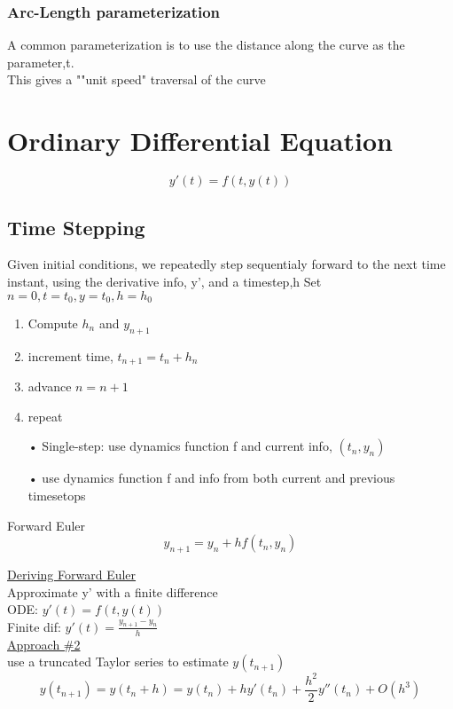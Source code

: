 \documentclass[10pt,usletter]{article}
\begin{document}
\subsubsection{Arc-Length parameterization}
A common parameterization is to use the distance along the curve as the parameter,t.\\
This gives a ""unit speed" traversal of the curve

\section{Ordinary Differential Equation}

$$y'(t)=f(t,y(t))$$

\subsection{Time Stepping}
Given initial conditions, we repeatedly step sequentialy forward to the next time instant, using the derivative info, y', and a timestep,h
Set $n=0,t=t_0,y=t_0,h=h_0$
\begin{enumerate}
\item Compute $h_n$ and $y_{n+1}$\\
\item increment time, $t_{n+1}=t_n+h_n$\\
\item advance $n=n+1$\\
\item repeat
\end{enumerate}

\begin{enumerate}
\item[•] Single-step: use dynamics function f and current info, $(t_n,y_n)$\\
\item[•] use dynamics function f and info from both current and previous timesetops
\end{enumerate}

Forward Euler
$$y_{n+1}=y_n+hf(t_n,y_n)$$

\underline{Deriving Forward Euler}\\
Approximate y' with a finite difference\\
ODE: $y'(t)=f(t,y(t))$\\
Finite dif: $y'(t)=\frac{y_{n+1}-y_n}{h}$\\

\underline{Approach \#2}\\
use a truncated Taylor series to estimate $y(t_{n+1})$
$$y(t_{n+1})=y(t_n+h)=y(t_n)+hy'(t_n)+\frac{h^2}{2}y''(t_n)+O(h^3)$$
\end{document}
